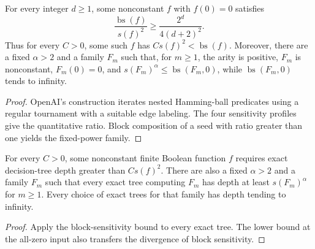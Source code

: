 \begin{theorem}
  \label{thm:analysis-sensitivity-separation}
  \leanok
  For every integer $d\ge1$, some nonconstant $f$ with $f(0)=0$ satisfies
  \[
    \frac{\operatorname{bs}(f)}{s(f)^2}
       \ge \frac{2^d}{4(d+2)^2}.
  \]
  Thus for every $C>0$, some such $f$ has $C s(f)^2<\operatorname{bs}(f)$.
  Moreover, there are a fixed $\alpha>2$ and a family $F_m$ such that, for
  $m\ge1$, the arity is positive, $F_m$ is nonconstant, $F_m(0)=0$, and
  $s(F_m)^\alpha\le\operatorname{bs}(F_m,0)$, while
  $\operatorname{bs}(F_m,0)$ tends to infinity.
\end{theorem}
\begin{proof}
  \leanok
  OpenAI's construction iterates nested Hamming-ball predicates using a
  regular tournament with a suitable edge labeling. The four sensitivity
  profiles give the quantitative ratio. Block composition of a seed with
  ratio greater than one yields the fixed-power family.
\end{proof}

\begin{corollary}
  \label{cor:analysis-sensitivity-query-separation}
  \leanok
  For every $C>0$, some nonconstant finite Boolean function $f$ requires
  exact decision-tree depth greater than $C s(f)^2$.
  There are also a fixed $\alpha>2$ and a family $F_m$ such that every exact
  tree computing $F_m$ has depth at least $s(F_m)^\alpha$ for $m\ge1$.
  Every choice of exact trees for that family has depth tending to infinity.
\end{corollary}
\begin{proof}
  \leanok
  Apply the block-sensitivity bound to every exact tree. The lower bound at
  the all-zero input also transfers the divergence of block sensitivity.
\end{proof}
